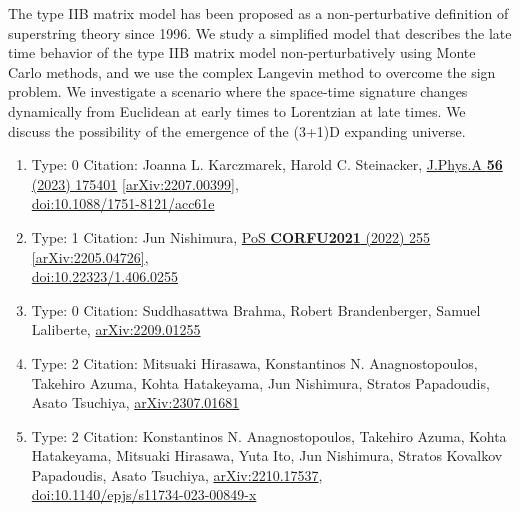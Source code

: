 \documentclass[a4paper,10pt]{article}
\begin{document}
\begin{enumerate}
The type IIB matrix model has been proposed as a non-perturbative definition of superstring theory since 1996. We study a simplified model that describes the late time behavior of the type IIB matrix model non-perturbatively using Monte Carlo methods, and we use the complex Langevin method to overcome the sign problem. We investigate a scenario where the space-time signature changes dynamically from Euclidean at early times to Lorentzian at late times. We discuss the possibility of the emergence of the (3+1)D expanding universe.
\begin{enumerate}
  \item Type: 0 Citation: Joanna L. Karczmarek, Harold C. Steinacker, \href{https://www.doi.org/10.1088/1751-8121/acc61e}{J.Phys.A {\bf 56} (2023) 175401}  \href{https://arxiv.org/abs/2207.00399}{[arXiv:2207.00399]},\\\href{https://www.doi.org/10.1088/1751-8121/acc61e}{doi:10.1088/1751-8121/acc61e}
  \item Type: 1 Citation: Jun Nishimura, \href{https://www.doi.org/10.22323/1.406.0255}{PoS {\bf CORFU2021} (2022) 255}  \href{https://arxiv.org/abs/2205.04726}{[arXiv:2205.04726]},\\\href{https://www.doi.org/10.22323/1.406.0255}{doi:10.22323/1.406.0255}
  \item Type: 0 Citation: Suddhasattwa Brahma, Robert Brandenberger, Samuel Laliberte, \href{https://arxiv.org/abs/2209.01255}{arXiv:2209.01255}
  \item Type: 2 Citation: Mitsuaki Hirasawa, Konstantinos N. Anagnostopoulos, Takehiro Azuma, Kohta Hatakeyama, Jun Nishimura, Stratos Papadoudis, Asato Tsuchiya, \href{https://arxiv.org/abs/2307.01681}{arXiv:2307.01681}
  \item Type: 2 Citation: Konstantinos N. Anagnostopoulos, Takehiro Azuma, Kohta Hatakeyama, Mitsuaki Hirasawa, Yuta Ito, Jun Nishimura, Stratos Kovalkov Papadoudis, Asato Tsuchiya, \href{https://arxiv.org/abs/2210.17537}{arXiv:2210.17537},\\\href{https://www.doi.org/10.1140/epjs/s11734-023-00849-x}{doi:10.1140/epjs/s11734-023-00849-x}

\end{enumerate}
\end{enumerate}
\end{document}
